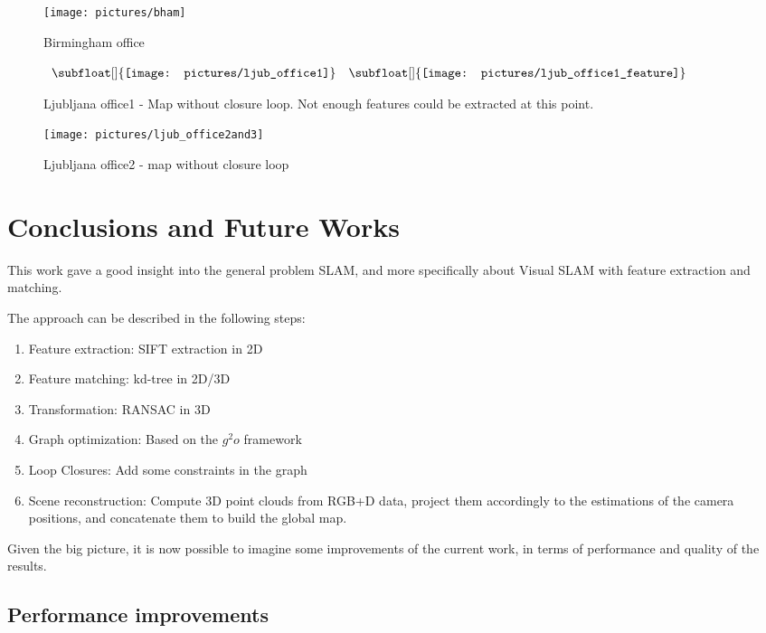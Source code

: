 \begin{figure}[h]
\centering
\texttt{[image: pictures/bham]}
\caption{Birmingham office}
\end{figure}

\begin{figure}[h]
\centering$
\begin{array}{cc}
\subfloat[]{\label{fig:ljub1_1} \texttt{[image: pictures/ljub\_office1]}} &
\subfloat[]{\label{fig:ljub1_2} \texttt{[image: pictures/ljub\_office1\_feature]}}
\end{array}$
\caption{Ljubljana office1 -  Map without closure loop.  Not enough features could be extracted at this point.}
\end{figure}


\begin{figure}[h]
\centering
\texttt{[image: pictures/ljub\_office2and3]}
\caption{Ljubljana office2 - map without closure loop}
\end{figure}

\chapter{Conclusions and Future Works}
\label{chap:conclusion}

This work gave a good insight into the general problem SLAM, and more specifically about Visual SLAM with feature extraction and matching.

The approach can be described in the following steps:
\begin{enumerate}
\item Feature extraction: SIFT extraction in 2D
\item Feature matching: kd-tree in 2D/3D
\item Transformation: RANSAC in 3D
\item Graph optimization: Based on the $g^2o$ framework
\item Loop Closures: Add some constraints in the graph
\item Scene reconstruction: Compute 3D point clouds from RGB+D data, project them accordingly to the estimations of the camera positions, and concatenate them to build the global map.
\end{enumerate}

Given the big picture, it is now possible to imagine some improvements of the current work, in terms of performance and quality of the results.

\section{Performance improvements}


